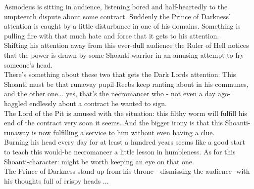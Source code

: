 Asmodeus is sitting in audience, listening bored and half-heartedly to the umpteenth dispute about some contract. Suddenly the Prince of Darkness' attention is caught by a little disturbance in one of his domains. Something is pulling fire with that much hate and force that it gets to his attention.\\

Shifting his attention away from this ever-dull audience the Ruler of Hell notices that the power is drawn by some Shoanti warrior in an amusing attempt to fry someone's head.\\

There's something about these two that gets the Dark Lords attention: This Shoanti must be that runaway pupil Reebs keep ranting about in his communes, and the other one... yes, that's the necromancer who - not even a day ago- haggled endlessly about a contract he wanted to sign.\\

The Lord of the Pit is amused with the situation: this filthy worm will fulfill his end of the contract very soon it seems. And the bigger irony is that this Shoanti-runaway is now fulfilling a service to him without even having a clue.\\

Burning his head every day for at least a hundred years seems like a good start to teach this would-be necromancer a little lesson in humbleness. As for this Shoanti-character: might be worth keeping an eye on that one.\\

The Prince of Darkness stand up from his throne - dismissing the audience- with his thoughts full of crispy heads ...\\

